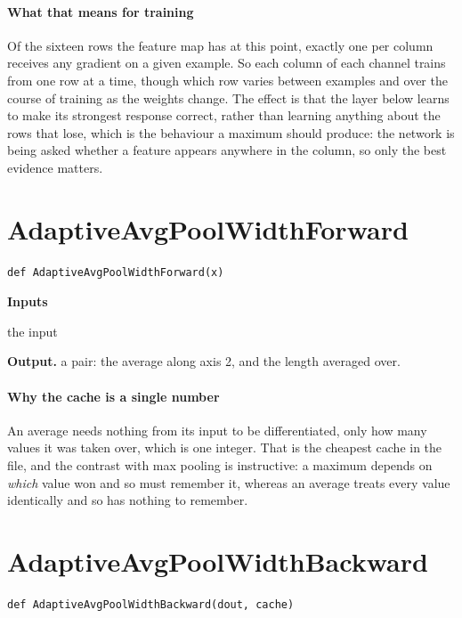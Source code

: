 \paragraph{What that means for training}
Of the sixteen rows the feature map has at this point, exactly one per column receives any gradient on a given example. So each column of each channel trains from one row at a time, though which row varies between examples and over the course of training as the weights change. The effect is that the layer below learns to make its strongest response correct, rather than learning anything about the rows that lose, which is the behaviour a maximum should produce: the network is being asked whether a feature appears anywhere in the column, so only the best evidence matters.


\section{AdaptiveAvgPoolWidthForward}
\begin{lstlisting}[style=sig]
def AdaptiveAvgPoolWidthForward(x)
\end{lstlisting}

\noindent\textbf{Inputs}
\begin{description}[leftmargin=2.2em,style=nextline,font=\normalfont\ttfamily]\setlength\itemsep{1pt}
  \item[{x}] \normalfont the input
\end{description}

\noindent\textbf{Output.} a pair: the average along axis 2, and the length averaged over.


\paragraph{Why the cache is a single number}
An average needs nothing from its input to be differentiated, only how many values it was taken over, which is one integer. That is the cheapest cache in the file, and the contrast with max pooling is instructive: a maximum depends on \emph{which} value won and so must remember it, whereas an average treats every value identically and so has nothing to remember.


\section{AdaptiveAvgPoolWidthBackward}
\begin{lstlisting}[style=sig]
def AdaptiveAvgPoolWidthBackward(dout, cache)
\end{lstlisting}

